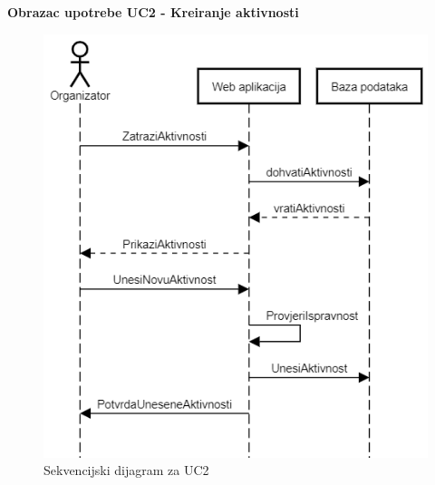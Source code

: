 \newpage
\textbf{Obrazac upotrebe UC2 - Kreiranje aktivnosti}
\begin{figure}[H]
	\centering
	\includegraphics[scale=0.6]{dijagrami/UC2.PNG}
	\caption{Sekvencijski dijagram za UC2}
	\label{fig: uc2 sekv}
	\label{fig: uc2 sekv}
\end{figure}

